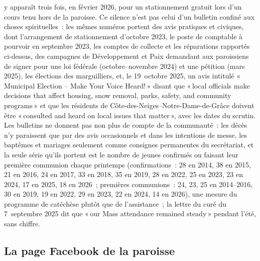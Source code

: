 \documentclass[11pt,letterpaper]{article}
\begin{document}
y apparaît trois fois, en février 2026, pour un stationnement gratuit lors d'un cours tenu hors de la paroisse. Ce silence n'est pas celui d'un bulletin confiné aux choses spirituelles~: les mêmes numéros portent des avis pratiques et civiques, dont l'arrangement de stationnement d'octobre 2023, le poste de comptable à pourvoir en septembre 2023, les comptes de collecte et les réparations rapportés ci-dessus, des campagnes de Développement et Paix demandant aux paroissiens de signer pour une loi fédérale (octobre--novembre 2024) et une pétition (mars 2025), les élections des marguilliers, et, le 19~octobre 2025, un avis intitulé «\,Municipal Election -- Make Your Voice Heard!\,» disant que «\,local officials make decisions that affect housing, snow removal, parks, safety, and community programs\,» et que les résidents de Côte-des-Neiges--Notre-Dame-de-Grâce doivent être «\,consulted and heard on local issues that matter\,», avec les dates du scrutin. Les bulletins ne donnent pas non plus de compte de la communauté~: les décès n'y paraissent que par des avis occasionnels et dans les intentions de messe, les baptêmes et mariages seulement comme consignes permanentes du secrétariat, et la seule série qu'ils portent est le nombre de jeunes confirmés ou faisant leur première communion chaque printemps (confirmations~: 28 en 2014, 38 en 2015, 21 en 2016, 24 en 2017, 33 en 2018, 35 en 2019, 28 en 2022, 25 en 2023, 23 en 2024, 17 en 2025, 18 en 2026~; premières communions~: 24, 23, 25 en 2014--2016, 30 en 2019, 19 en 2022, 29 en 2023, 22 en 2024, 14 en 2026), une mesure du programme de catéchèse plutôt que de l'assistance~; la lettre du curé du 7~septembre 2025 dit que «\,our Mass attendance remained steady\,» pendant l'été, sans chiffre.

\subsection{La page Facebook de la paroisse}
\end{document}
